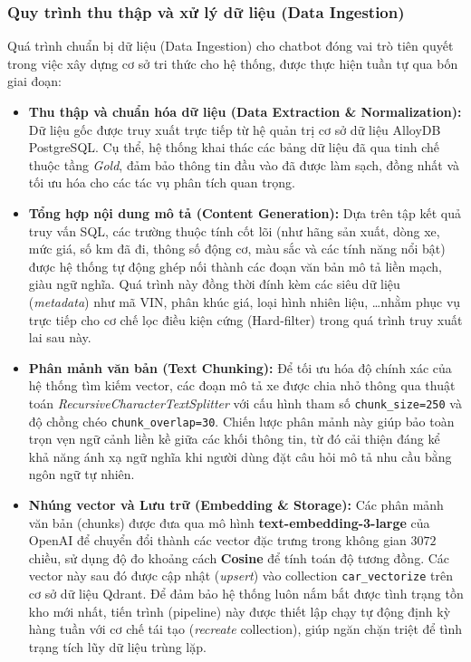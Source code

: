 \subsubsection{Quy trình thu thập và xử lý dữ liệu (Data Ingestion)}

Quá trình chuẩn bị dữ liệu (Data Ingestion) cho chatbot đóng vai trò tiên quyết trong việc xây dựng cơ sở tri thức cho hệ thống, được thực hiện tuần tự qua bốn giai đoạn:

\begin{itemize}
    \item \textbf{Thu thập và chuẩn hóa dữ liệu (Data Extraction \& Normalization):} Dữ liệu gốc được truy xuất trực tiếp từ hệ quản trị cơ sở dữ liệu AlloyDB PostgreSQL. Cụ thể, hệ thống khai thác các bảng dữ liệu đã qua tinh chế thuộc tầng \textit{Gold}, đảm bảo thông tin đầu vào đã được làm sạch, đồng nhất và tối ưu hóa cho các tác vụ phân tích quan trọng.

    \item \textbf{Tổng hợp nội dung mô tả (Content Generation):} Dựa trên tập kết quả truy vấn SQL, các trường thuộc tính cốt lõi (như hãng sản xuất, dòng xe, mức giá, số km đã đi, thông số động cơ, màu sắc và các tính năng nổi bật) được hệ thống tự động ghép nối thành các đoạn văn bản mô tả liền mạch, giàu ngữ nghĩa. Quá trình này đồng thời đính kèm các siêu dữ liệu (\textit{metadata}) như mã VIN, phân khúc giá, loại hình nhiên liệu, \ldots nhằm phục vụ trực tiếp cho cơ chế lọc điều kiện cứng (Hard-filter) trong quá trình truy xuất lai sau này.

    \item \textbf{Phân mảnh văn bản (Text Chunking):} Để tối ưu hóa độ chính xác của hệ thống tìm kiếm vector, các đoạn mô tả xe được chia nhỏ thông qua thuật toán \textit{RecursiveCharacterTextSplitter} với cấu hình tham số \texttt{chunk\_size=250} và độ chồng chéo \texttt{chunk\_overlap=30}. Chiến lược phân mảnh này giúp bảo toàn trọn vẹn ngữ cảnh liền kề giữa các khối thông tin, từ đó cải thiện đáng kể khả năng ánh xạ ngữ nghĩa khi người dùng đặt câu hỏi mô tả nhu cầu bằng ngôn ngữ tự nhiên.

    \item \textbf{Nhúng vector và Lưu trữ (Embedding \& Storage):} Các phân mảnh văn bản (chunks) được đưa qua mô hình \textbf{text-embedding-3-large} của OpenAI để chuyển đổi thành các vector đặc trưng trong không gian $3072$ chiều, sử dụng độ đo khoảng cách \textbf{Cosine} để tính toán độ tương đồng. Các vector này sau đó được cập nhật (\textit{upsert}) vào collection \texttt{car\_vectorize} trên cơ sở dữ liệu Qdrant. Để đảm bảo hệ thống luôn nắm bắt được tình trạng tồn kho mới nhất, tiến trình (pipeline) này được thiết lập chạy tự động định kỳ hàng tuần với cơ chế tái tạo (\textit{recreate} collection), giúp ngăn chặn triệt để tình trạng tích lũy dữ liệu trùng lặp.
\end{itemize}

